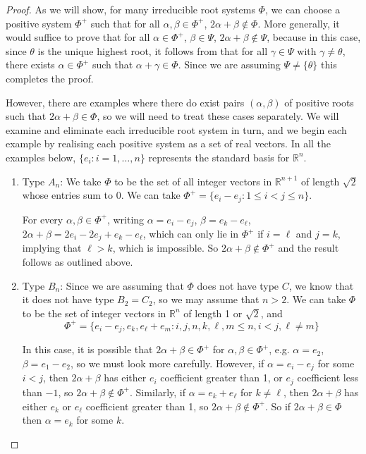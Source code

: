 \documentclass[12pt,a4paper]{article}
\let\\=\cr
\theoremstyle{definition}
\theoremstyle{remark}
\theoremstyle{custthm}
\begin{document}
\begin{proof}

As we will show, for many irreducible root systems $\Phi$, we can choose a positive system $\Phi^+$ such that for all $\alpha,\beta\in\Phi^+$, $2\alpha+\beta\notin\Phi$. More generally, it would suffice to prove that for all $\alpha\in\Phi^+$, $\beta\in\Psi$, $2\alpha+\beta\notin\Psi$, because in this case, since $\theta$ is the unique highest root, it follows from \cite[Lemma 3.2]{root} that for all $\gamma\in\Psi$ with $\gamma\neq\theta$, there exists $\alpha\in\Phi^+$ such that $\alpha+\gamma\in\Phi$. Since we are assuming $\Psi\neq\{\theta\}$ this completes the proof.

However, there are examples where there do exist pairs $(\alpha,\beta)$ of positive roots such that $2\alpha+\beta\in\Phi$, so we will need to treat these cases separately. We will examine and eliminate each irreducible root system in turn, and we begin each example by realising each positive system as a set of real vectors. In all the examples below, $\{e_i:i=1,\dots,n\}$ represents the standard basis for $\mathbb{R}^n$.

\begin{enumerate}

    \item Type $A_n$: We take $\Phi$ to be the set of all integer vectors in $\mathbb{R}^{n+1}$ of length $\sqrt{2}$ whose entries sum to 0. We can take $\Phi^+=\{e_i-e_j:1\leq i<j\leq n\}$.

    For every $\alpha,\beta\in\Phi^+$, writing $\alpha=e_i-e_{j}$, $\beta=e_k-e_\ell$, $2\alpha+\beta=2e_i-2e_j+e_k-e_\ell$, which can only lie in $\Phi^+$ if $i=\ell$ and $j=k$, implying that $\ell>k$, which is impossible. So $2\alpha+\beta\notin\Phi^+$ and the result follows as outlined above.\\

    \item Type $B_n$: Since we are assuming that $\Phi$ does not have type $C$, we know that it does not have type $B_2=C_2$, so we may assume that $n>2$. We can take $\Phi$ to be the set of integer vectors in $\mathbb{R}^n$ of length 1 or $\sqrt{2}$, and $$\Phi^+=\{e_i-e_j,e_k,e_\ell+e_m:i,j,n,k,\ell,m\leq n, i<j,\ell\neq m\}$$

    In this case, it is possible that $2\alpha+\beta\in\Phi^+$ for $\alpha,\beta\in\Phi^+$, e.g. $\alpha=e_2$, $\beta=e_1-e_2$, so we must look more carefully. However, if $\alpha=e_i-e_j$ for some $i<j$, then $2\alpha+\beta$ has either $e_i$ coefficient greater than 1, or $e_j$ coefficient less than $-1$, so $2\alpha+\beta\notin\Phi^+$. Similarly, if $\alpha=e_k+e_\ell$ for $k\neq \ell$, then $2\alpha+\beta$ has either $e_k$ or $e_\ell$ coefficient greater than 1, so $2\alpha+\beta\notin\Phi^+$. So if $2\alpha+\beta\in\Phi$ then $\alpha=e_k$ for some $k$.
    

\end{enumerate}
\end{proof}
\end{document}
